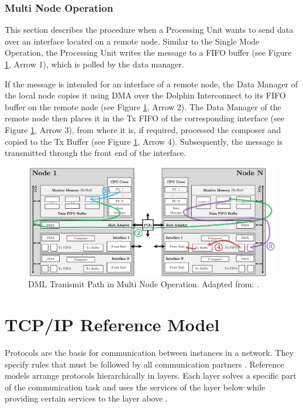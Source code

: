 \subsubsection{Multi Node Operation}
This section describes the procedure when a Processing Unit wants to send data over an interface located on a remote node. Similar to the Single Mode Operation, the Processing Unit writes the message to a FIFO buffer (see Figure \ref{fig:DmlTransMultiNode}, Arrow 1), which is polled by the data manager.

If the message is intended for an interface of a remote node, the Data Manager of the local node copies it using DMA over the Dolphin Interconnect to its FIFO buffer on the remote node (see Figure \ref{fig:DmlTransMultiNode}, Arrow 2). The Data Manager of the remote node then places it in the Tx FIFO of the corresponding interface (see Figure \ref{fig:DmlTransMultiNode}, Arrow 3), from where it is, if required, processed the composer and copied to the Tx Buffer (see Figure \ref{fig:DmlTransMultiNode}, Arrow 4). Subsequently, the message is transmitted through the front end of the interface. \\

\begin{figure}[!h]
    \centering
    \includegraphics[width=\linewidth]{figures/dml/dml03b.pdf}
    \caption[DML Transmit Path in Multi Node Operation]{DML Tranismit Path in Multi Node Operation. Adapted from: \cite{dml01}.}
    \label{fig:DmlTransMultiNode}
\end{figure}

\clearpage


\section{TCP/IP Reference Model} \label{chap:RefModel}

Protocols are the basis for communication between instances in a network. They specify rules that must be followed by all communication partners \cite{Tanenbaum2010}. Reference models arrange protocols hierarchically in layers. Each layer solves a specific part of the communication task and uses the services of the layer below while providing certain services to the layer above \cite{Weigel2021}.

